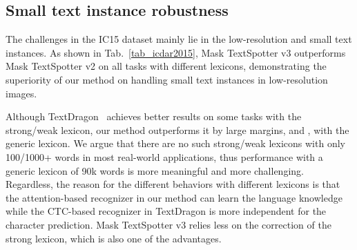 \documentclass[runningheads]{llncs}
\begin{document}
\subsection{Small text instance robustness}
The challenges in the IC15 dataset mainly lie in the low-resolution and small text instances. As shown in Tab.~\ref{tab_icdar2015}, Mask TextSpotter v3 outperforms Mask TextSpotter v2 on all tasks with different lexicons, demonstrating the superiority of our method on handling small text instances in low-resolution images.

Although TextDragon~\cite{TextDragon} achieves better results on some tasks with the strong/weak lexicon, our method outperforms it by large margins,  and , with the generic lexicon. We argue that there are no such strong/weak lexicons with only 100/1000+ words in most real-world applications, thus performance with a generic lexicon of 90k words is more meaningful and more challenging. Regardless, the reason for the different behaviors with different lexicons is that the attention-based recognizer in our method can learn the language knowledge while the CTC-based recognizer in TextDragon is more independent for the character prediction. Mask TextSpotter v3 relies less on the correction of the strong lexicon, which is also one of the advantages.
\end{document}
